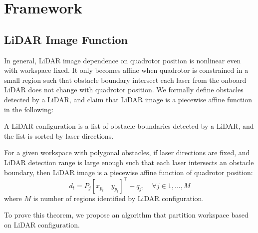\section{Framework}

\subsection{LiDAR Image Function}

In general, LiDAR image dependence on quadrotor position is nonlinear even with workspace fixed.
It only becomes affine when quadrotor is constrained in a small region such that obstacle boundary
intersect each laser from the onboard LiDAR does not change with quadrotor position.
We formally define obstacles detected by a LiDAR, and claim that LiDAR image is a piecewise affine function in the following:

\begin{definition}
    A LiDAR configuration is a list of obstacle boundaries detected by a LiDAR, and the list is sorted by laser directions.
\end{definition}

\begin{theorem}
    For a given workspace with polygonal obstacles, if laser directions are fixed, 
    and LiDAR detection range is large enough such that each laser intersects an obstacle boundary, 
    then LiDAR image is a piecewise affine function of quadrotor position:
    \begin{equation}
        \label{eq:image_func}
        d_t = P_j [x_{p_t} \quad y_{p_t}]^\intercal + q_j, \quad \forall j \in {1, ..., M} 
    \end{equation}
    where $M$ is number of regions identified by LiDAR configuration.
\end{theorem}    

To prove this theorem, we propose an algorithm that partition workspace based on LiDAR configuration.

